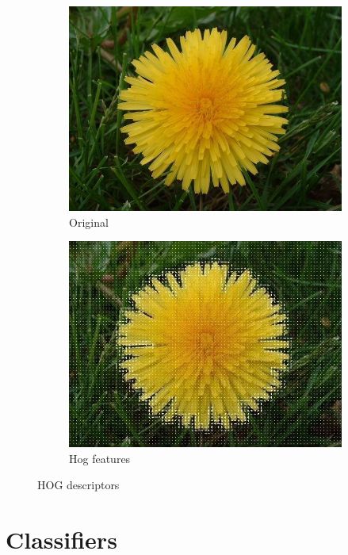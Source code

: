 \documentclass[11]{article}
\begin{document}
\begin{figure}[H]
    \begin{subfigure}[t]{0.45\textwidth}
    \centering
  \includegraphics[scale=0.234]{images/originalhogg.jpg}
    \caption{Original}
    \label{originalhogg}
    \end{subfigure}
    \begin{subfigure}[t]{0.45\textwidth}
    \centering
    \includegraphics[scale=0.345]{images/hogg.jpg}
    \caption{Hog features}
    \label{hogg2}
    \end{subfigure}
    \label{hogg}
    \caption{HOG descriptors}
\end{figure}



\section{Classifiers}
\end{document}
